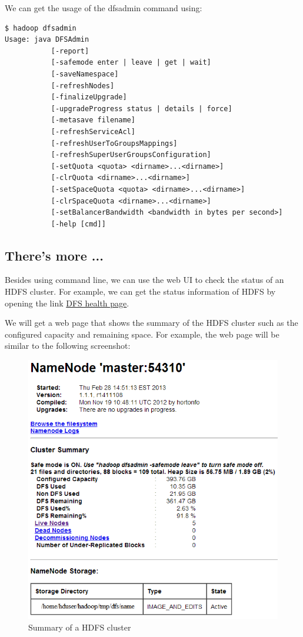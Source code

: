 We can get the usage of the dfsadmin command using: 
\begin{verbatim}
$ hadoop dfsadmin
Usage: java DFSAdmin
           [-report]
           [-safemode enter | leave | get | wait]
           [-saveNamespace]
           [-refreshNodes]
           [-finalizeUpgrade]
           [-upgradeProgress status | details | force]
           [-metasave filename]
           [-refreshServiceAcl]
           [-refreshUserToGroupsMappings]
           [-refreshSuperUserGroupsConfiguration]
           [-setQuota <quota> <dirname>...<dirname>]
           [-clrQuota <dirname>...<dirname>]
           [-setSpaceQuota <quota> <dirname>...<dirname>]
           [-clrSpaceQuota <dirname>...<dirname>]
           [-setBalancerBandwidth <bandwidth in bytes per second>]
           [-help [cmd]]
\end{verbatim}

\subsection*{There's more ...}
Besides using command line, we can use the web UI to check the status of an HDFS cluster. For example, we can get the status information of HDFS by opening the link \href{http://master:50070/dfshealth.jsp}{DFS health page}.

We will get a web page that shows the summary of the HDFS cluster such as the configured capacity and remaining space. For example, the web page will be similar to the following screenshot:
\begin{figure}[h]
  \centering
  \includegraphics[width=.7\textwidth]{figs/5163OS_04_08.png}
  \caption{Summary of a HDFS cluster}\label{fig:hdfs.summary}
\end{figure} 

